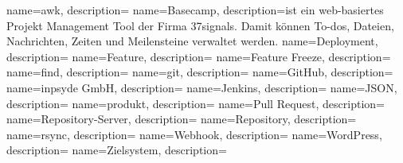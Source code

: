  {
  name=awk,
  description={}
}
 {
  name=Basecamp,
  description={ist ein web-basiertes Projekt Management Tool der Firma 37signals. Damit können To-dos, Dateien, Nachrichten, Zeiten und Meilensteine verwaltet werden.}
}
 {
  name=Deployment,
  description={}
}
 {
  name=Feature,
  description={}
}
 {
  name=Feature Freeze,
  description={}
}
 {
  name=find,
  description={}
}
 {
  name=git,
  description={}
}
 {
  name=GitHub,
  description={}
}
 {
  name=inpsyde GmbH,
  description={}
}
 {
  name=Jenkins,
  description={}
}
 {
  name=JSON,
  description={}
}
 {
  name=produkt,
  description={}
}
 {
  name=Pull Request,
  description={}
}
 {
  name=Repository-Server,
  description={}
}
 {
  name=Repository,
  description={}
}
 {
  name=rsync,
  description={}
}
 {
  name=Webhook,
  description={}
}
 {
  name=WordPress,
  description={}
}
 {
  name=Zielsystem,
  description={}
}


\makeglossaries